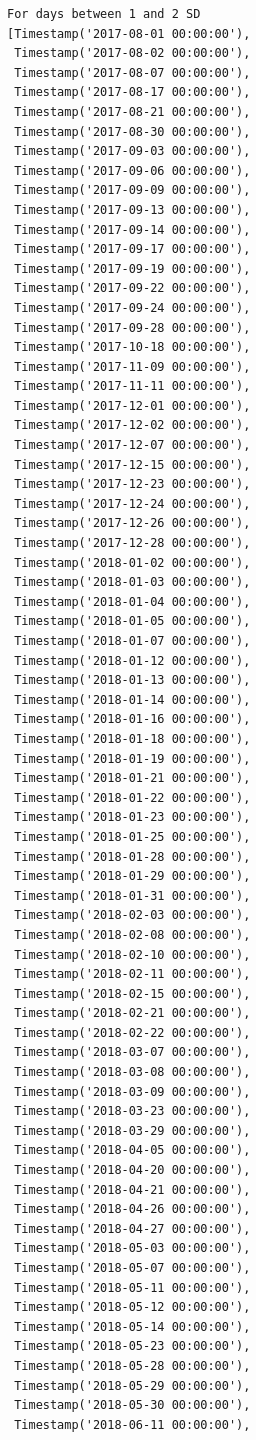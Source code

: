 \begin{verbatim}
For days between 1 and 2 SD
[Timestamp('2017-08-01 00:00:00'),
 Timestamp('2017-08-02 00:00:00'),
 Timestamp('2017-08-07 00:00:00'),
 Timestamp('2017-08-17 00:00:00'),
 Timestamp('2017-08-21 00:00:00'),
 Timestamp('2017-08-30 00:00:00'),
 Timestamp('2017-09-03 00:00:00'),
 Timestamp('2017-09-06 00:00:00'),
 Timestamp('2017-09-09 00:00:00'),
 Timestamp('2017-09-13 00:00:00'),
 Timestamp('2017-09-14 00:00:00'),
 Timestamp('2017-09-17 00:00:00'),
 Timestamp('2017-09-19 00:00:00'),
 Timestamp('2017-09-22 00:00:00'),
 Timestamp('2017-09-24 00:00:00'),
 Timestamp('2017-09-28 00:00:00'),
 Timestamp('2017-10-18 00:00:00'),
 Timestamp('2017-11-09 00:00:00'),
 Timestamp('2017-11-11 00:00:00'),
 Timestamp('2017-12-01 00:00:00'),
 Timestamp('2017-12-02 00:00:00'),
 Timestamp('2017-12-07 00:00:00'),
 Timestamp('2017-12-15 00:00:00'),
 Timestamp('2017-12-23 00:00:00'),
 Timestamp('2017-12-24 00:00:00'),
 Timestamp('2017-12-26 00:00:00'),
 Timestamp('2017-12-28 00:00:00'),
 Timestamp('2018-01-02 00:00:00'),
 Timestamp('2018-01-03 00:00:00'),
 Timestamp('2018-01-04 00:00:00'),
 Timestamp('2018-01-05 00:00:00'),
 Timestamp('2018-01-07 00:00:00'),
 Timestamp('2018-01-12 00:00:00'),
 Timestamp('2018-01-13 00:00:00'),
 Timestamp('2018-01-14 00:00:00'),
 Timestamp('2018-01-16 00:00:00'),
 Timestamp('2018-01-18 00:00:00'),
 Timestamp('2018-01-19 00:00:00'),
 Timestamp('2018-01-21 00:00:00'),
 Timestamp('2018-01-22 00:00:00'),
 Timestamp('2018-01-23 00:00:00'),
 Timestamp('2018-01-25 00:00:00'),
 Timestamp('2018-01-28 00:00:00'),
 Timestamp('2018-01-29 00:00:00'),
 Timestamp('2018-01-31 00:00:00'),
 Timestamp('2018-02-03 00:00:00'),
 Timestamp('2018-02-08 00:00:00'),
 Timestamp('2018-02-10 00:00:00'),
 Timestamp('2018-02-11 00:00:00'),
 Timestamp('2018-02-15 00:00:00'),
 Timestamp('2018-02-21 00:00:00'),
 Timestamp('2018-02-22 00:00:00'),
 Timestamp('2018-03-07 00:00:00'),
 Timestamp('2018-03-08 00:00:00'),
 Timestamp('2018-03-09 00:00:00'),
 Timestamp('2018-03-23 00:00:00'),
 Timestamp('2018-03-29 00:00:00'),
 Timestamp('2018-04-05 00:00:00'),
 Timestamp('2018-04-20 00:00:00'),
 Timestamp('2018-04-21 00:00:00'),
 Timestamp('2018-04-26 00:00:00'),
 Timestamp('2018-04-27 00:00:00'),
 Timestamp('2018-05-03 00:00:00'),
 Timestamp('2018-05-07 00:00:00'),
 Timestamp('2018-05-11 00:00:00'),
 Timestamp('2018-05-12 00:00:00'),
 Timestamp('2018-05-14 00:00:00'),
 Timestamp('2018-05-23 00:00:00'),
 Timestamp('2018-05-28 00:00:00'),
 Timestamp('2018-05-29 00:00:00'),
 Timestamp('2018-05-30 00:00:00'),
 Timestamp('2018-06-11 00:00:00'),

\end{verbatim}
